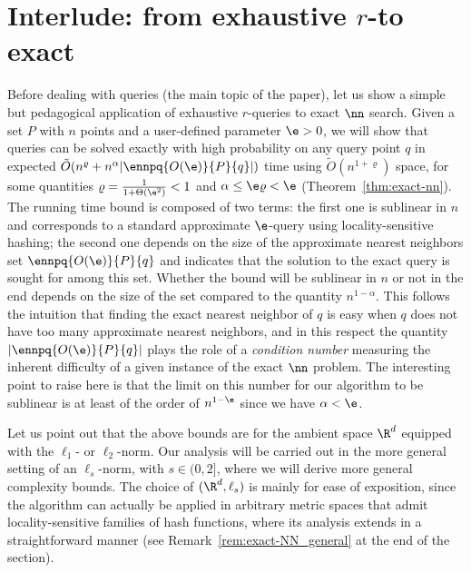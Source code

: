 \section{Interlude: from exhaustive $r$-\pleb to exact \nn}
\label{sec:exact-nn}

Before dealing with \rnn queries (the main topic of the paper),
let us show a simple but pedagogical application of exhaustive
$r$-\pleb queries to exact $\nn$ search. Given a set $P$ with $n$ points
and a user-defined parameter $\e>0$, we will show that \nn queries can
be solved exactly with high probability on any query point $q$ in
expected $\tilde O(n^\varrho + n^\alpha |\ennpq{O(\e)}{P}{q}|)$ time
using $\tilde O(n^{1+\varrho})$ space, for some quantities
$\varrho= \frac{1}{1+\Theta(\e^2)}<1$ and $\alpha\leq\e\varrho<\e$
(Theorem~\ref{thm:exact-nn}). The running time bound is composed of
two terms: the first one is sublinear in $n$ and corresponds to a
standard approximate $\e$-\nn query using locality-sensitive hashing;
the second one depends on the size of the approximate nearest
neighbors set $\ennpq{O(\e)}{P}{q}$ and indicates that the solution to
the exact query is sought for among this set. Whether the bound will
be sublinear in $n$ or not in the end depends on the size of the set
compared to the quantity $n^{1-\alpha}$. This follows the intuition
that finding the exact nearest neighbor of $q$ is easy when $q$ does
not have too many approximate nearest neighbors, and in this respect
the quantity $|\ennpq{O(\e)}{P}{q}|$ plays the role of a {\em
  condition number} measuring the inherent difficulty of a given
instance of the exact $\nn$ problem. The interesting point to raise
here is that the limit on this number for our algorithm to be
sublinear is at least of the order of $n^{1-\e}$ since we
have $\alpha<\e$.


Let us point out that the above bounds are for the ambient space
$\R^d$ equipped with the $\ell_1$- or $\ell_2$-norm. Our analysis will
be carried out in the more general setting of an $\ell_s$-norm, with
$s\in (0,2]$, where we will derive more general complexity bounds.
  The choice of $(\R^d, \ell_s)$ is mainly for ease of
  exposition, since the algorithm can actually be applied in arbitrary
  metric spaces that admit locality-sensitive families of hash
  functions, where its analysis extends in a straightforward manner
  (see Remark~\ref{rem:exact-NN_general} at the end of the section).


